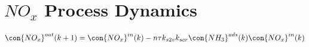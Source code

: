 \section{$NO_x$ Process Dynamics}

\begin{align}
    \con{NO_x}^{out} (k + 1) = \con{NO_x}^{in} (k) - n \tau k_{s2v} k_{scr} \con{NH_3}^{ads} (k) \con{NO_x}^{in} (k)
\end{align}
